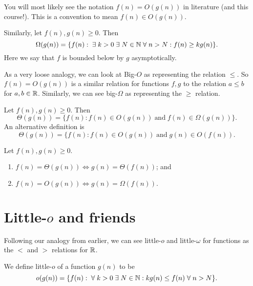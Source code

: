 You will most likely see the notation $f(n) = O(g(n))$ in literature (and this course!). 
This is a convention to mean $f(n) \in O(g(n))$.

\begin{definition}
    Similarly, let $f(n), g(n) \geq 0$. 
    Then 
    \[\Omega(g(n)) = \{ f(n) : \;\exists\; k > 0 \;\exists\; N \in \mathbb{N} \;\forall\; n > N : f(n) \geq k g(n) \}.\] 
    Here we say that $f$ is bounded below by $g$ asymptotically.
\end{definition}

As a very loose analogy, we can look at Big-$O$ as representing the relation $\leq$. 
So 
$f(n) = O(g(n))$ 
is a similar relation for functions $f, g$ to the relation $a \leq b$ for $a, b \in \mathbb{R}$. 
Similarly, we can see big-$\Omega$ as representing the $\geq$ relation.

\begin{definition}
    Let $f(n), g(n) \geq 0$. 
    Then 
    \[ \Theta(g(n)) = \{ f(n) : f(n) \in O(g(n)) \;\text{and}\; f(n) \in \Omega(g(n)) \}. \] 
    An alternative definition is 
    \[ \Theta(g(n)) = \{ f(n) : f(n) \in O(g(n)) \;\text{and}\; g(n) \in O(f(n)). \]
\end{definition}

\begin{proposition}
    Let $f(n), g(n) \geq 0$.
    \begin{enumerate}
        \item $f(n) = \Theta(g(n)) \iff g(n) = \Theta(f(n))$; and
        \item $f(n) = O(g(n)) \iff g(n) = \Omega(f(n))$.
    \end{enumerate}
\end{proposition}

\section{Little-$o$ and friends}

Following our analogy from earlier, 
we can see little-$o$ and little-$\omega$ for functions as the $<$ and $>$ relations for $\mathbb{R}$.

\begin{definition}[Little-$o$]
    We define little-$o$ of a function $g(n)$ to be 
    \[ o(g(n)) = 
        \{ f(n) : 
            \;\forall\; k > 0 \;\exists\; N \in \mathbb{N} : 
            kg(n) \leq f(n) \;\forall\; n > N 
        \}.
    \]
\end{definition}

